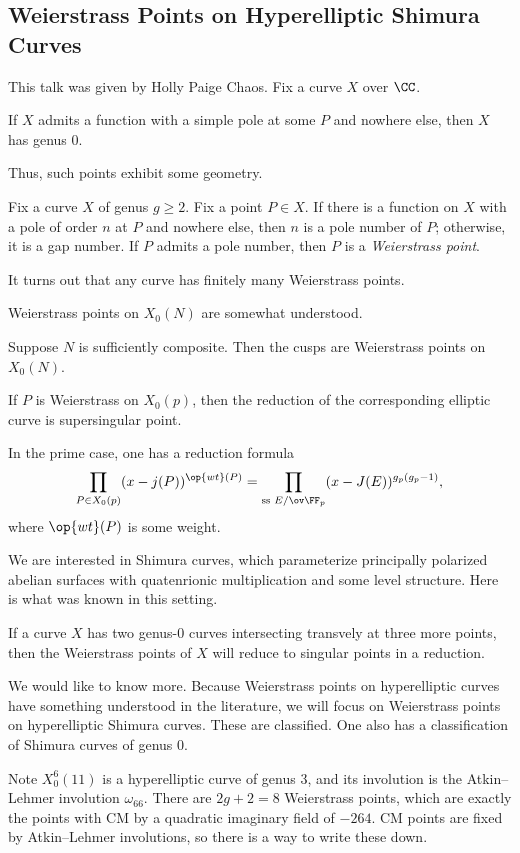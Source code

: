 \documentclass{article}
\begin{document}
\subsection{Weierstrass Points on Hyperelliptic Shimura Curves}
This talk was given by Holly Paige Chaos. Fix a curve $X$ over $\CC$.
\begin{example}
	If $X$ admits a function with a simple pole at some $P$ and nowhere else, then $X$ has genus $0$.
\end{example}
Thus, such points exhibit some geometry.
\begin{definition}
	Fix a curve $X$ of genus $g\ge2$. Fix a point $P\in X$. If there is a function on $X$ with a pole of order $n$ at $P$ and nowhere else, then $n$ is a pole number of $P$; otherwise, it is a gap number. If $P$ admits a pole number, then $P$ is a \textit{Weierstrass point}.
\end{definition}
\begin{remark}
	It turns out that any curve has finitely many Weierstrass points.
\end{remark}
Weierstrass points on $X_0(N)$ are somewhat understood.
\begin{theorem}
	Suppose $N$ is sufficiently composite. Then the cusps are Weierstrass points on $X_0(N)$.
\end{theorem}
\begin{theorem}
	If $P$ is Weierstrass on $X_0(p)$, then the reduction of the corresponding elliptic curve is supersingular point.
\end{theorem}
\begin{remark}
	In the prime case, one has a reduction formula
	\[\prod_{P\in X_0(p)}(x-j(P))^{\op{wt}(P)}=\prod_{\text{ss }E/\ov\FF_p}(x-J(E))^{g_p(g_p-1)},\]
	where $\op{wt}(P)$ is some weight.
\end{remark}
We are interested in Shimura curves, which parameterize principally polarized abelian surfaces with quatenrionic multiplication and some level structure. Here is what was known in this setting.
\begin{theorem}[Baker]
	If a curve $X$ has two genus-$0$ curves intersecting transvely at three more points, then the Weierstrass points of $X$ will reduce to singular points in a reduction.
\end{theorem}
We would like to know more. Because Weierstrass points on hyperelliptic curves have something understood in the literature, we will focus on Weierstrass points on hyperelliptic Shimura curves. These are classified. One also has a classification of Shimura curves of genus $0$.
\begin{example}
	Note $X_0^6(11)$ is a hyperelliptic curve of genus $3$, and its involution is the Atkin--Lehmer involution $\omega_{66}$. There are $2g+2=8$ Weierstrass points, which are exactly the points with CM by a quadratic imaginary field of $-264$. CM points are fixed by Atkin--Lehmer involutions, so there is a way to write these down.
\end{example}
\end{document}
